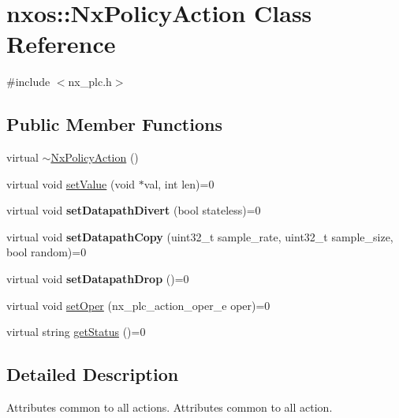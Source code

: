 \hypertarget{classnxos_1_1NxPolicyAction}{\section{nxos\-:\-:Nx\-Policy\-Action Class Reference}
\label{classnxos_1_1NxPolicyAction}
}


{\ttfamily \#include $<$nx\-\_\-plc.\-h$>$}

\subsection*{Public Member Functions}
\begin{DoxyCompactItemize}
\item 
virtual \hyperlink{classnxos_1_1NxPolicyAction_a23e5f4e5257ac41a99de35d299ba73a6}{$\sim$\-Nx\-Policy\-Action} ()
\item 
virtual void \hyperlink{classnxos_1_1NxPolicyAction_aaa53c4ff9ea907be4af86e27b9cd0895}{set\-Value} (void $\ast$val, int len)=0
\item 
\hypertarget{classnxos_1_1NxPolicyAction_a46e025d5e284e55d7131210a53623512}{virtual void {\bfseries set\-Datapath\-Divert} (bool stateless)=0}\label{classnxos_1_1NxPolicyAction_a46e025d5e284e55d7131210a53623512}

\item 
\hypertarget{classnxos_1_1NxPolicyAction_a6a673e1c4cad646c769175372df38f54}{virtual void {\bfseries set\-Datapath\-Copy} (uint32\-\_\-t sample\-\_\-rate, uint32\-\_\-t sample\-\_\-size, bool random)=0}\label{classnxos_1_1NxPolicyAction_a6a673e1c4cad646c769175372df38f54}

\item 
\hypertarget{classnxos_1_1NxPolicyAction_a953d11dabc5f79443dbb8c64e6366192}{virtual void {\bfseries set\-Datapath\-Drop} ()=0}\label{classnxos_1_1NxPolicyAction_a953d11dabc5f79443dbb8c64e6366192}

\item 
virtual void \hyperlink{classnxos_1_1NxPolicyAction_a76cafea458f282b9d63c7d92f0b00059}{set\-Oper} (nx\-\_\-plc\-\_\-action\-\_\-oper\-\_\-e oper)=0
\item 
virtual string \hyperlink{classnxos_1_1NxPolicyAction_abbe57090a2f35b741274c96a075405ae}{get\-Status} ()=0
\end{DoxyCompactItemize}


\subsection{Detailed Description}
Attributes common to all actions. Attributes common to all action. 

